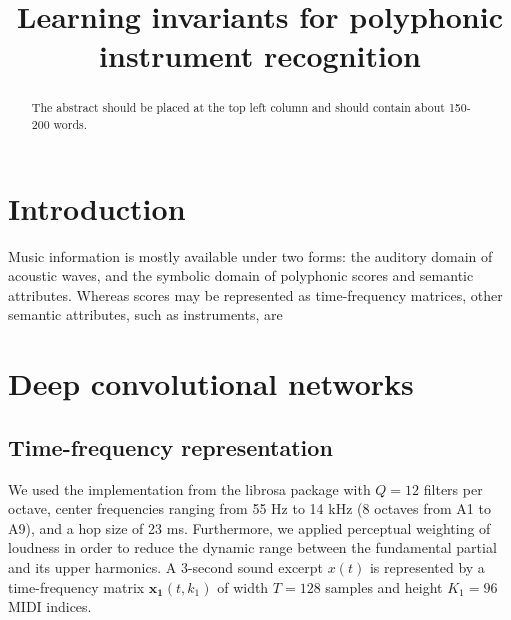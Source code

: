 \documentclass{article}
\title{Learning invariants for polyphonic instrument recognition}
\begin{document}
%
\maketitle
%
\begin{abstract}
The abstract should be placed at the top left column and should contain about 150-200 words.
\end{abstract}
%

\section{Introduction}\label{sec:introduction}
Music information is mostly available under two forms: the auditory domain of acoustic waves, and the symbolic domain of polyphonic scores and semantic attributes. Whereas scores may be represented as time-frequency matrices, other semantic attributes, such as instruments, are 






\section{Deep convolutional networks}
\subsection{Time-frequency representation}
We used the implementation from the librosa package \cite{McFee2015} with $Q=12$ filters per octave, center frequencies ranging from 55 Hz to 14 kHz (8 octaves from A1 to A9), and a hop size of 23 ms. Furthermore, we applied perceptual weighting of loudness in order to reduce the dynamic range between the fundamental partial and its upper harmonics. A 3-second sound excerpt $x(t)$ is represented by a time-frequency matrix $\boldsymbol{x_1}(t,k_1)$ of width $T=128$ samples and height $K_1=96$ MIDI indices.
\end{document}
